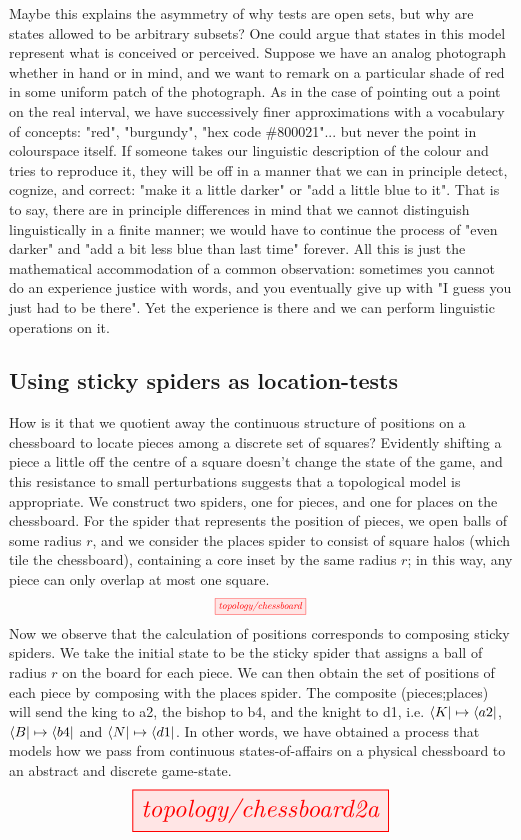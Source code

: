 Maybe this explains the asymmetry of why tests are open sets, but why are states allowed to be arbitrary subsets? One could argue that states in this model represent what is conceived or perceived. Suppose we have an analog photograph whether in hand or in mind, and we want to remark on a particular shade of red in some uniform patch of the photograph. As in the case of pointing out a point on the real interval, we have successively finer approximations with a vocabulary of concepts: "red", "burgundy", "hex code \#800021"... but never the point in colourspace itself. If someone takes our linguistic description of the colour and tries to reproduce it, they will be off in a manner that we can in principle detect, cognize, and correct: "make it a little darker" or "add a little blue to it". That is to say, there are in principle differences in mind that we cannot distinguish linguistically in a finite manner; we would have to continue the process of "even darker" and "add a bit less blue than last time" forever. All this is just the mathematical accommodation of a common observation: sometimes you cannot do an experience justice with words, and you eventually give up with "I guess you just had to be there". Yet the experience is there and we can perform linguistic operations on it.

\clearpage

\begin{myboxB}
\subsection{Using sticky spiders as location-tests}
\begin{example}\label{ex:chessboard}
How is it that we quotient away the continuous structure of positions on a chessboard to locate pieces among a discrete set of squares? Evidently shifting a piece a little off the centre of a square doesn't change the state of the game, and this resistance to small perturbations suggests that a topological model is appropriate. We construct two spiders, one for pieces, and one for places on the chessboard. For the spider that represents the position of pieces, we open balls of some radius $r$, and we consider the places spider to consist of square halos (which tile the chessboard), containing a core inset by the same radius $r$; in this way, any piece can only overlap at most one square.
\[\scalebox{0.70}{\tikzfig{topology/chessboard}}\]
Now we observe that the calculation of positions corresponds to composing sticky spiders. We take the initial state to be the sticky spider that assigns a ball of radius $r$ on the board for each piece. We can then obtain the set of positions of each piece by composing with the places spider. The composite (pieces;places)
will send the king to a2, the bishop to b4, and the knight to d1, i.e. $\bra{K} \mapsto \bra{a2}$, $\bra{B} \mapsto \bra{b4}$ and $\bra{N} \mapsto \bra{d1}$. In other words, we have obtained a process that models how we pass from continuous states-of-affairs on a physical chessboard to an abstract and discrete game-state.
\[\resizebox{0.6\textwidth}{!}{\tikzfig{topology/chessboard2a}}\]
\end{example}
\end{myboxB}
\clearpage

